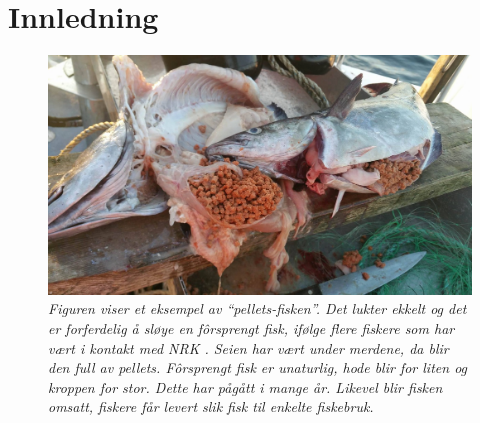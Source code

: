 \section{Innledning}




\begin{figure} 
\begin{center} 
\includegraphics[scale=0.2]{figures/oppdrettfor}
\caption{\small \sl Figuren viser et eksempel av ``pellets-fisken''. Det lukter ekkelt og det er forferdelig å sløye en fôrsprengt fisk, ifølge flere fiskere som har vært i kontakt med NRK \cite{Trana m.fl. 2019}. Seien har vært under merdene, da blir den full av pellets. Fôrsprengt fisk er unaturlig, hode blir for liten og kroppen for stor. Dette har pågått i mange år. Likevel blir fisken omsatt, fiskere får levert slik fisk til enkelte fiskebruk. \cite{Angell og Ekanger 2017} \label{fig:oppdrettfor}} 
\end{center} 
\end{figure} 

